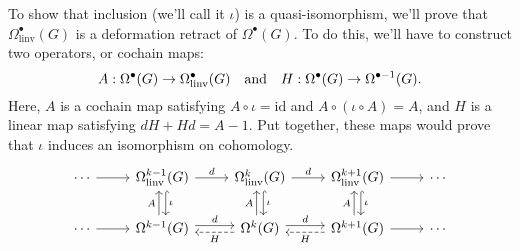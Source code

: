 \documentclass{../../templates/lkx_pset}
\begin{document}
\begin{parts}
	To show that inclusion (we'll call it $\iota$) is a quasi-isomorphism, we'll prove that $\Omega^\bullet_{\textrm{linv}}(G)$ is a deformation retract of $\Omega^\bullet(G)$. To do this, we'll have to construct two operators, or cochain maps:
	\[
		A : \Omega^\bullet(G) \to \Omega^\bullet_{\textrm{linv}}(G)\quad\textrm{and}\quad H : \Omega^\bullet(G) \to \Omega^{\bullet-1}(G).
	\]
	Here, $A$ is a cochain map satisfying $A \circ \iota = \textrm{id}$ and $A\circ (\iota\circ A) = A$, and $H$ is a linear map satisfying $dH + Hd = A - 1$. Put together, these maps would prove that $\iota$ induces an isomorphism on cohomology.
	\[\begin{tikzcd}
			\cdots & {\Omega^{k-1}_{\textrm{linv}}(G)} & {\Omega^k_{\textrm{linv}}(G)} & {\Omega^{k+1}_{\textrm{linv}}(G)} & \cdots \\
			\cdots & {\Omega^{k-1}(G)} & {\Omega^{k}(G)} & {\Omega^{k+1}(G)} & \cdots
			\arrow[from=1-1, to=1-2]
			\arrow["d", from=1-2, to=1-3]
			\arrow["\iota", shift left, hook, from=1-2, to=2-2]
			\arrow["d", from=1-3, to=1-4]
			\arrow["\iota", shift left, hook, from=1-3, to=2-3]
			\arrow[from=1-4, to=1-5]
			\arrow["\iota", shift left, hook, from=1-4, to=2-4]
			\arrow[from=2-1, to=2-2]
			\arrow["A", shift left, from=2-2, to=1-2]
			\arrow["d", shift left, from=2-2, to=2-3]
			\arrow["A", shift left, from=2-3, to=1-3]
			\arrow["H", shift left, dashed, from=2-3, to=2-2]
			\arrow["d", shift left, from=2-3, to=2-4]
			\arrow["A", shift left, from=2-4, to=1-4]
			\arrow["H", shift left, dashed, from=2-4, to=2-3]
			\arrow[from=2-4, to=2-5]
		\end{tikzcd}\]


\end{parts}
\end{document}
